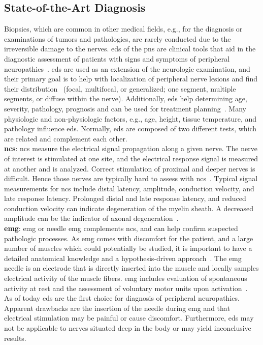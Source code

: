\subsection{State-of-the-Art Diagnosis}
Biopsies, which are common in other medical fields, e.g., for the diagnosis or examinations of tumors and pathologies, are rarely conducted due to the irreversible damage to the nerves. \gls{eds} of the \gls{pns} are clinical tools that aid in the diagnostic assessment of patients with signs and symptoms of peripheral neuropathies~\cite{Mohassel2015}. \gls{eds} are used as an extension of the neurologic examination, and their primary goal is to help with localization of peripheral nerve lesions and find their distribution~\cite{Mohassel2015} (focal, multifocal, or generalized; one segment, multiple segments, or diffuse within the nerve). Additionally, \gls{eds} help determining age, severity, pathology, prognosis and can be used for treatment planning~\cite{Mohassel2015}. Many physiologic and non-physiologic factors, e.g., age, height, tissue temperature, and pathology influence \gls{eds}. Normally, \gls{eds} are composed of two different tests, which are related and complement each other.\\

\textbf{\gls{ncs}}: \gls{ncs} measure the electrical signal propagation along a given nerve. The nerve of interest is stimulated at one site, and the electrical response signal is measured at another and is analyzed. Correct stimulation of proximal and deeper nerves is difficult. Hence those nerves are typically hard to assess with \gls{ncs}~\cite{Mohassel2015}. Typical signal measurements for \gls{ncs} include distal latency, amplitude, conduction velocity, and late response latency. Prolonged distal and late response latency, and reduced conduction velocity can indicate degeneration of the myelin sheath. A decreased amplitude can be the indicator of axonal degeneration~\cite{Mohassel2015}.\\

\textbf{\gls{emg}}: \gls{emg} or needle {emg} complements \gls{ncs}, and can help confirm suspected pathologic processes. As \gls{emg} comes with discomfort for the patient, and a large number of muscles which could potentially be studied, it is important to have a detailed anatomical knowledge and a hypothesis-driven approach~\cite{Mohassel2015}. The \gls{emg} needle is an electrode that is directly inserted into the muscle and locally samples electrical activity of the muscle fibers. \gls{emg} includes evaluation of spontaneous activity at rest and the assessment of voluntary motor units upon activation~\cite{Mohassel2015}.\\
As of today \gls{eds} are the first choice for diagnosis of peripheral neuropathies. Apparent drawbacks are the insertion of the needle during \gls{emg} and that electrical stimulation may be painful or cause discomfort. Furthermore, \gls{eds} may not be applicable to nerves situated deep in the body or may yield inconclusive results.

